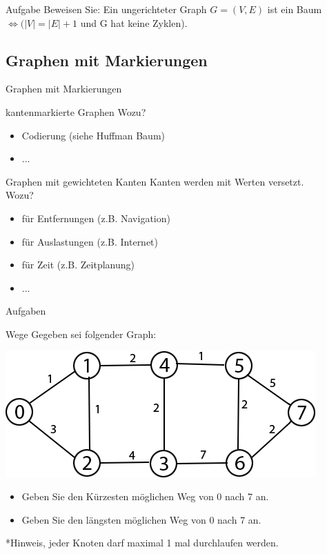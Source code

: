 	
	\begin{frame}{Aufgabe}
		Beweisen Sie: Ein ungerichteter Graph $G = (V,E)$ ist ein Baum $\Leftrightarrow (|V| =
|E| + 1$ und G hat keine Zyklen).
	\end{frame}
	
	
	
	\subsection{Graphen mit Markierungen}
	\begin{frame}{Graphen mit Markierungen}
		\begin{block}{kantenmarkierte Graphen}
			Wozu?\\
			\begin{itemize}
				\pause
				\item Codierung (siehe Huffman Baum)
				\pause
				\item ...
			\end{itemize}
		\end{block}
		
		\pause
		\begin{block}{Graphen mit gewichteten Kanten}
			Kanten werden mit Werten versetzt.\\
			Wozu?\\
			\begin{itemize}
				\pause
				\item für Entfernungen (z.B. Navigation)
				\pause
				\item für Auslastungen (z.B. Internet)
				\pause
				\item für Zeit (z.B. Zeitplanung)
				\item ...
			\end{itemize}
		\end{block}
	\end{frame}
	
	
	\begin{frame}{Aufgaben}
		\begin{block}{Wege}
			Gegeben sei folgender Graph:\\
			\begin{center}
				\includegraphics[scale=0.5]{graphics/07/graph.png}
			\end{center}
			
			\begin{itemize}
				\item Geben Sie den Kürzesten möglichen Weg von 0 nach 7 an.
				\item Geben Sie den längsten möglichen Weg von 0 nach 7 an.
			\end{itemize}
			*Hinweis, jeder Knoten darf maximal 1 mal durchlaufen werden.
		\end{block}
	\end{frame}
	
